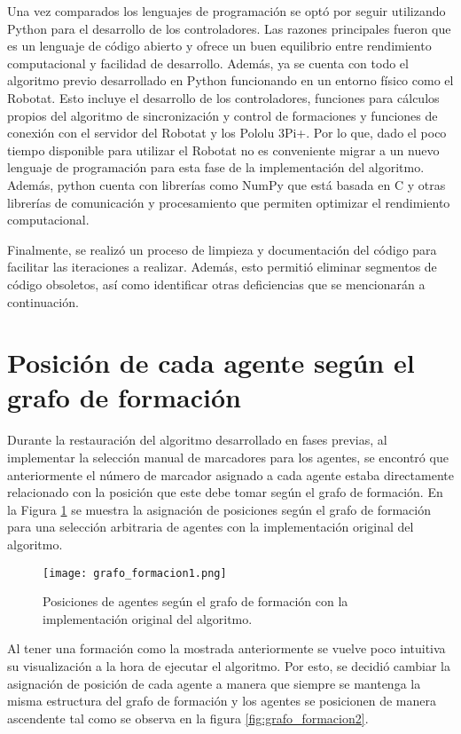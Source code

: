 Una vez comparados los lenguajes de programación se optó por seguir utilizando Python para el desarrollo de los controladores. Las razones principales fueron que es un lenguaje de código abierto y ofrece un buen equilibrio entre rendimiento computacional y facilidad de desarrollo. Además, ya se cuenta con todo el algoritmo previo desarrollado en Python funcionando en un entorno físico como el Robotat. Esto incluye el desarrollo de los controladores, funciones para cálculos propios del algoritmo de sincronización y control de formaciones y funciones de conexión con el servidor del Robotat y los Pololu 3Pi+. Por lo que, dado el poco tiempo disponible para utilizar el Robotat no es conveniente migrar a un nuevo lenguaje de programación para esta fase de la implementación del algoritmo. Además, python cuenta con librerías como NumPy que está basada en C y otras librerías de comunicación y procesamiento que permiten optimizar el rendimiento computacional.

Finalmente, se realizó un proceso de limpieza y documentación del código para facilitar las iteraciones a realizar. Además, esto permitió eliminar segmentos de código obsoletos, así como identificar otras deficiencias que se mencionarán a continuación.

\section{Posición de cada agente según el grafo de formación}
Durante la restauración del algoritmo desarrollado en fases previas, al implementar la selección manual de marcadores para los agentes, se encontró que anteriormente el número de marcador asignado a cada agente estaba directamente relacionado con la posición que este debe tomar según el grafo de formación. En la Figura \ref{fig:grafo_formacion1} se muestra la asignación de posiciones según el grafo de formación para una selección arbitraria de agentes con la implementación original del algoritmo.

\begin{figure}[H]
	\centering
	\texttt{[image: grafo\_formacion1.png]}
	\caption{Posiciones de agentes según el grafo de formación con la implementación original del algoritmo.}
	\label{fig:grafo_formacion1}
\end{figure}

Al tener una formación como la mostrada anteriormente se vuelve poco intuitiva su visualización a la hora de ejecutar el algoritmo. Por esto, se decidió cambiar la asignación de posición de cada agente a manera que siempre se mantenga la misma estructura del grafo de formación y los agentes se posicionen de manera ascendente tal como se observa en la figura \ref{fig:grafo_formacion2}.

